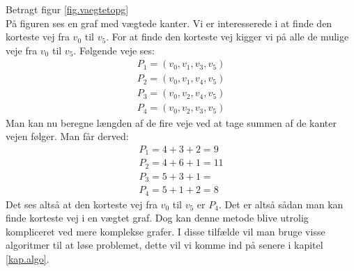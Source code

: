 \begin{exmp}
Betragt figur \ref{fig.vaegtetopg} \\

På figuren ses en graf med vægtede kanter. Vi er interesserede i at finde den korteste vej fra $v_0$ til $v_5$. For at finde den korteste vej kigger vi på alle de mulige veje fra $v_0$ til $v_5$.
Følgende veje ses:
\begin{align*}
	P_1=(v_0,v_1,v_3,v_5)\\
	P_2=(v_0,v_1,v_4,v_5)\\
	P_3=(v_0,v_2,v_4,v_5)\\
	P_4=(v_0,v_2,v_3,v_5)
\end{align*}
Man kan nu beregne længden af de fire veje ved at tage summen af de kanter vejen følger. Man får derved:
\begin{align*}
	P_1=4+3+2=9\\
	P_2=4+6+1=11\\
	P_3=5+3+1=\\
	P_4=5+1+2=8
\end{align*}
Det ses altså at den korteste vej fra $v_0$ til $v_5$ er $P_4$. 
Det er altså sådan man kan finde korteste vej i en vægtet graf. Dog kan denne metode blive utrolig kompliceret ved mere komplekse grafer. I disse tilfælde vil man bruge visse algoritmer til at løse problemet, dette vil vi komme ind på senere i kapitel \ref{kap.algo}.
\end{exmp}

